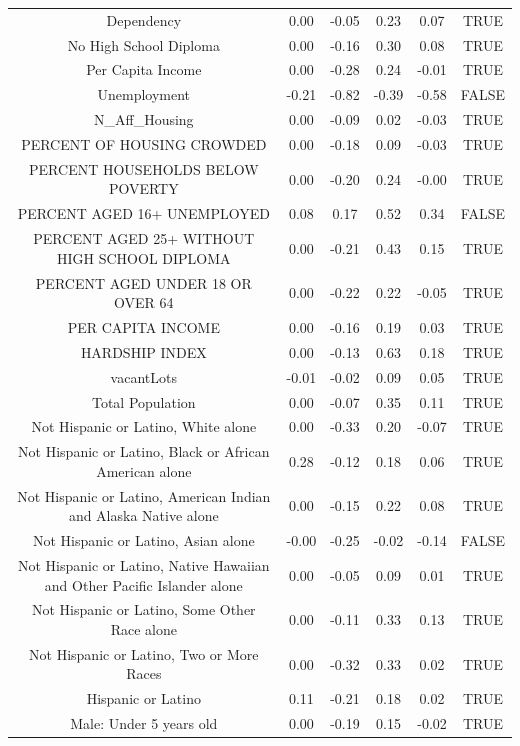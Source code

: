 \documentclass{article} %
\begin{document}
\begin{table}[H]
\begin{adjustbox}{width = \textwidth, height = \textheight}
\begin{tabular}{cccccc}
  Dependency & 0.00 & -0.05 & 0.23 & 0.07 & TRUE \\ 
  No High School Diploma & 0.00 & -0.16 & 0.30 & 0.08 & TRUE \\ 
  Per Capita Income & 0.00 & -0.28 & 0.24 & -0.01 & TRUE \\ 
  Unemployment & -0.21 & -0.82 & -0.39 & -0.58 & FALSE \\ 
  N\_Aff\_Housing & 0.00 & -0.09 & 0.02 & -0.03 & TRUE \\ 
  PERCENT OF HOUSING CROWDED & 0.00 & -0.18 & 0.09 & -0.03 & TRUE \\ 
  PERCENT HOUSEHOLDS BELOW POVERTY & 0.00 & -0.20 & 0.24 & -0.00 & TRUE \\ 
  PERCENT AGED 16+ UNEMPLOYED & 0.08 & 0.17 & 0.52 & 0.34 & FALSE \\ 
  PERCENT AGED 25+ WITHOUT HIGH SCHOOL DIPLOMA & 0.00 & -0.21 & 0.43 & 0.15 & TRUE \\ 
  PERCENT AGED UNDER 18 OR OVER 64 & 0.00 & -0.22 & 0.22 & -0.05 & TRUE \\ 
  PER CAPITA INCOME & 0.00 & -0.16 & 0.19 & 0.03 & TRUE \\ 
  HARDSHIP INDEX & 0.00 & -0.13 & 0.63 & 0.18 & TRUE \\ 
  vacantLots & -0.01 & -0.02 & 0.09 & 0.05 & TRUE \\ 
  Total Population & 0.00 & -0.07 & 0.35 & 0.11 & TRUE \\ 
  Not Hispanic or Latino, White alone & 0.00 & -0.33 & 0.20 & -0.07 & TRUE \\ 
  Not Hispanic or Latino, Black or African American alone & 0.28 & -0.12 & 0.18 & 0.06 & TRUE \\ 
  Not Hispanic or Latino, American Indian and Alaska Native alone & 0.00 & -0.15 & 0.22 & 0.08 & TRUE \\ 
  Not Hispanic or Latino, Asian alone & -0.00 & -0.25 & -0.02 & -0.14 & FALSE \\ 
  Not Hispanic or Latino, Native Hawaiian and Other Pacific Islander alone & 0.00 & -0.05 & 0.09 & 0.01 & TRUE \\ 
  Not Hispanic or Latino, Some Other Race alone & 0.00 & -0.11 & 0.33 & 0.13 & TRUE \\ 
  Not Hispanic or Latino, Two or More Races & 0.00 & -0.32 & 0.33 & 0.02 & TRUE \\ 
  Hispanic or Latino & 0.11 & -0.21 & 0.18 & 0.02 & TRUE \\ 
  Male: Under 5 years old & 0.00 & -0.19 & 0.15 & -0.02 & TRUE \\ 

\end{tabular}
\end{adjustbox}
\end{table}
\end{document}
